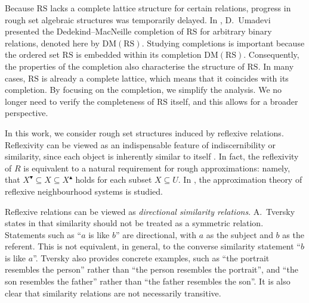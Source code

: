 \documentclass[11pt,a4paper]{amsart}
\newcommand{\UP}{\blacktriangle}
\newcommand{\DOWN}{\blacktriangledown}
\theoremstyle{plain}
\theoremstyle{definition}
\theoremstyle{remark}
\numberwithin{equation}{section}
\begin{document}
Because $\mathrm{RS}$ lacks a complete lattice structure for certain relations, progress 
in rough set algebraic structures was temporarily delayed.
In \cite{Umadevi2015}, D.~Umadevi presented the
Dedekind--MacNeille completion of $\mathrm{RS}$ for arbitrary binary 
relations, denoted here by $\mathrm{DM(RS)}$. 
Studying completions is important because the ordered set 
$\mathrm{RS}$ is embedded 
within its completion $\mathrm{DM(RS)}$. Consequently, the properties of  the completion also characterise the structure of $\mathrm{RS}$. 
In many cases, $\mathrm{RS}$ is already a complete lattice, which means that it coincides with its completion. 
By focusing on the completion, we simplify the analysis. We no longer need to verify the completeness of 
$\mathrm{RS}$ itself, and this allows for a broader perspective. 


In this work, we consider rough set structures induced by reflexive relations.  
Reflexivity can be viewed as an indispensable feature of indiscernibility or similarity, since each object is inherently similar to itself \cite{SlowVand00}.  
In fact, the reflexivity of $R$ is equivalent to a natural
requirement for rough approximations: namely, that 
$X^\DOWN \subseteq X \subseteq X^\UP$ holds for each subset 
$X\subseteq U$. In \cite{SyauJia12}, the approximation theory of 
reflexive neighbourhood systems is studied.

Reflexive relations can be viewed as \emph{directional similarity relations}. A.~Tversky states in \cite{Tversky77} that
similarity should not be treated as a symmetric relation. Statements such as
``$a$ is like $b$'' are directional, with $a$ as 
the subject and $b$ as the referent. This is not equivalent, in general,
to the converse similarity statement ``$b$ is like $a$''. Tversky also provides 
concrete examples, such as
``the portrait resembles the person'' rather than ``the person resembles the
portrait'', and ``the son resembles the father'' rather than ``the father resembles
the son''. It is also clear that similarity relations are
not necessarily transitive.
\end{document}
